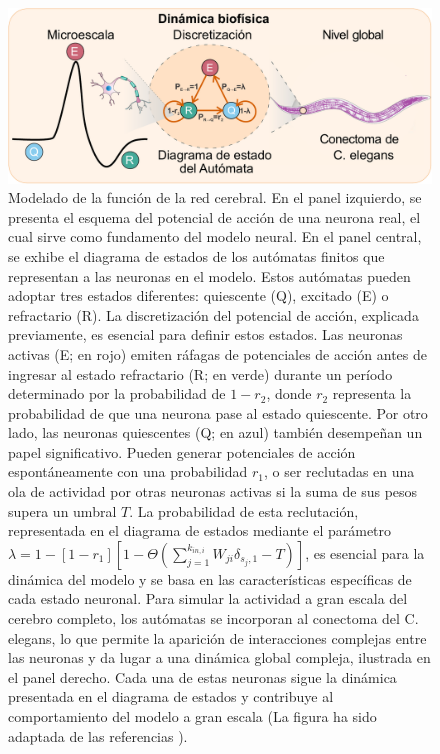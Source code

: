 \begin{figure}[ht]
	\centering\includegraphics[width=\imsize]{modelo}
	\caption[Modelado de la función de la red cerebral.]{ Modelado de la función de la red cerebral. En el panel izquierdo, se presenta el esquema del potencial de acción de una neurona real, el cual sirve como fundamento del modelo neural. En el panel central, se exhibe el diagrama de estados de los autómatas finitos que representan a las neuronas en el modelo. Estos autómatas pueden adoptar tres estados diferentes: quiescente (Q), excitado (E) o refractario (R). La discretización del potencial de acción, explicada previamente, es esencial para definir estos estados. Las neuronas activas (E; en rojo) emiten ráfagas de potenciales de acción antes de ingresar al estado refractario (R; en verde) durante un período determinado por la probabilidad de $1-r_2$, donde $r_2$ representa la probabilidad de que una neurona pase al estado quiescente. Por otro lado, las neuronas quiescentes (Q; en azul) también desempeñan un papel significativo. Pueden generar potenciales de acción espontáneamente con una probabilidad $r_1$, o ser reclutadas en una ola de actividad por otras neuronas activas si la suma de sus pesos supera un umbral $T$. La probabilidad de esta reclutación, representada en el diagrama de estados mediante el parámetro $\lambda=1-\left[1-r_1\right]\left[1-\Theta\left(\sum_{j=1}^{k_{in,i}}W_{ji}\delta_{s_j,1}-T\right)\right]$, es esencial para la dinámica del modelo y se basa en las características específicas de cada estado neuronal. Para simular la actividad a gran escala del cerebro completo, los autómatas se incorporan al conectoma del C. elegans, lo que permite la aparición de interacciones complejas entre las neuronas y da lugar a una dinámica global compleja, ilustrada en el panel derecho. Cada una de estas neuronas sigue la dinámica presentada en el diagrama de estados y contribuye al comportamiento del modelo a gran escala (La figura ha sido adaptada de las referencias \cite{lynn_physics_2019, jjfroehlich_english_2022}).}\label{fig:spikeautomata}
\end{figure}


